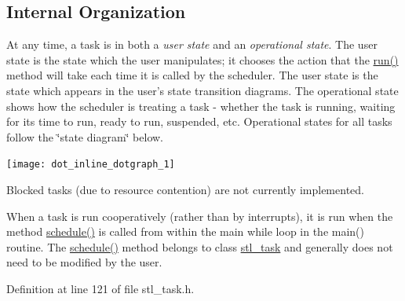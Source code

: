 \hypertarget{classstl__task_task_intrn}{}\subsection{Internal Organization}\label{classstl__task_task_intrn}
At any time, a task is in both a {\itshape user state} and an {\itshape operational state}. The user state is the state which the user manipulates; it chooses the action that the \hyperlink{classstl__task_a35f8eccc4a9c6737d217402b3cb0ffee}{run()} method will take each time it is called by the scheduler. The user state is the state which appears in the user's state transition diagrams. The operational state shows how the scheduler is treating a task -\/ whether the task is running, waiting for its time to run, ready to run, suspended, etc. Operational states for all tasks follow the \char`\"{}state diagram\char`\"{} below.

\begin{center}

\begin{DoxyImageNoCaption}
  \mbox{\texttt{[image: dot\_inline\_dotgraph\_1]}}
\end{DoxyImageNoCaption}
\end{center}
 Blocked tasks (due to resource contention) are not currently implemented.

When a task is run cooperatively (rather than by interrupts), it is run when the method \hyperlink{classstl__task_a86a54618c911663e235f07fba78c728a}{schedule()} is called from within the main while loop in the main() routine. The \hyperlink{classstl__task_a86a54618c911663e235f07fba78c728a}{schedule()} method belongs to class \hyperlink{classstl__task}{stl\-\_\-task} and generally does not need to be modified by the user. 

Definition at line 121 of file stl\-\_\-task.\-h.



